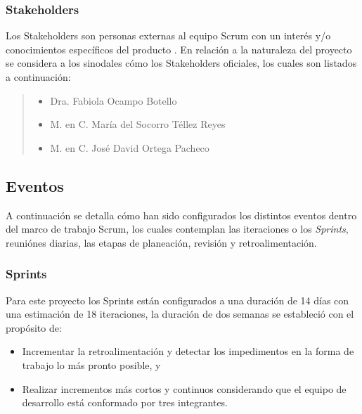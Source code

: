 \subsubsection{Stakeholders}

 Los Stakeholders son personas externas al equipo Scrum con un interés y/o conocimientos
 específicos del producto \cite{ScrumGlosary}. En relación a la naturaleza del proyecto se
 considera a los sinodales cómo los Stakeholders oficiales, los cuales son listados a
 continuación:

    \begin{quote}
    \begin{itemize}
        \item Dra. Fabiola Ocampo Botello
        \item M. en C. María del Socorro Téllez Reyes
        \item M. en C. José David Ortega Pacheco
    \end{itemize}
    \end{quote}

\subsection{Eventos}
 
 A continuación se detalla cómo han sido configurados los distintos eventos dentro del marco de trabajo
 Scrum, los cuales contemplan las iteraciones o los {\it Sprints}, reuniónes diarias, las etapas de
 planeación, revisión y retroalimentación.

\subsubsection{Sprints}

 \noindent Para este proyecto los Sprints están configurados a una duración de 14 días con una
 estimación de 18 iteraciones, la duración de dos semanas se estableció con el propósito de:
    
    \begin{itemize}
    \item Incrementar la retroalimentación y detectar los impedimentos
          en la forma de trabajo lo más pronto posible, y

    \item Realizar incrementos más cortos y continuos considerando que el
          equipo de desarrollo está conformado por tres integrantes.
    \end{itemize}

